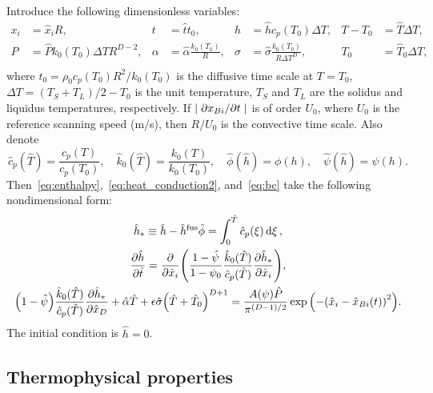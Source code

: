 \documentclass{article}
\newcommand{\fusion}[1]{{#1}^\mathrm{fus}}
\begin{document}
Introduce the following dimensionless variables:
\begin{equation}\label{eq:dimensionless}
    \begin{aligned}
        x_i &= \hat{x}_iR, & t &= \hat{t}t_0, & h &= \hat{h}c_p(T_0)\Delta{T}, & T - T_0 &= \hat{T}\Delta{T}, \\
        P &= \hat{P} k_0(T_0)\Delta{T}R^{D-2}, & \alpha &= \hat{\alpha}\frac{k_0(T_0)}R, &
            \sigma &= \hat{\sigma}\frac{k_0(T_0)}{R\Delta{T}^D}, & T_0 &= \hat{T}_0\Delta{T}, \\
    \end{aligned}
\end{equation}
where \(t_0 = \rho_0 c_p(T_0) R^2/k_0(T_0)\) is the diffusive time scale at \(T=T_0\),
\(\Delta{T} = (T_S+T_L)/2 - T_0\) is the unit temperature,
\(T_S\) and \(T_L\) are the solidus and liquidus temperatures, respectively.
If \(|\pdv*{x_{Bi}}{t}|\) is of order \(U_0\), where \(U_0\) is the reference scanning speed (\si{m/s}),
then \(R/U_0\) is the convective time scale. Also denote
\begin{equation}\label{eq:dimensionless2}
    \hat{c}_p(\hat{T}) = \frac{c_p(T)}{c_p(T_0)}, \quad
    \hat{k}_0(\hat{T}) = \frac{k_0(T)}{k_0(T_0)}, \quad
    \hat{\phi}(\hat{h}) = \phi(h), \quad
    \hat{\psi}(\hat{h}) = \psi(h).
\end{equation}
Then~\eqref{eq:enthalpy},~\eqref{eq:heat_conduction2}, and~\eqref{eq:bc} take the following nondimensional form:
\begin{gather}
	\hat{h}_* \equiv \hat{h} - \fusion{\hat{h}}\hat{\phi} = \int_0^{\hat{T}} \hat{c}_p(\xi)\dd{\xi}, \label{eq:enthalpy_hats} \\
	\pdv{\hat{h}}{\hat{t}} = \pdv{\hat{x}_i}\qty(
	    \frac{1-\hat{\psi}}{1-\psi_0}
	    \frac{\hat{k}_0(\hat{T})}{\hat{c}_p(\hat{T})}\pdv{\hat{h}_*}{\hat{x}_i}
	), \label{eq:heat_conduction_hats} \\
	\qty(1 - \hat{\psi}) \frac{\hat{k}_0(\hat{T})}{\hat{c}_p(\hat{T})}\pdv{\hat{h}_*}{\hat{x}_D} +
	    \hat{\alpha}\hat{T} + \epsilon\hat{\sigma} \qty(\hat{T} + \hat{T}_0)^{D+1} =
	    \frac{A(\psi)\hat{P}}{\pi^{(D-1)/2}}\exp\qty( -\qty(\hat{x}_i-\hat{x}_{Bi}(t))^2 ). \label{eq:bc_hats}
\end{gather}
The initial condition is \(\hat{h} = 0\).

\subsection{Thermophysical properties}
\end{document}
